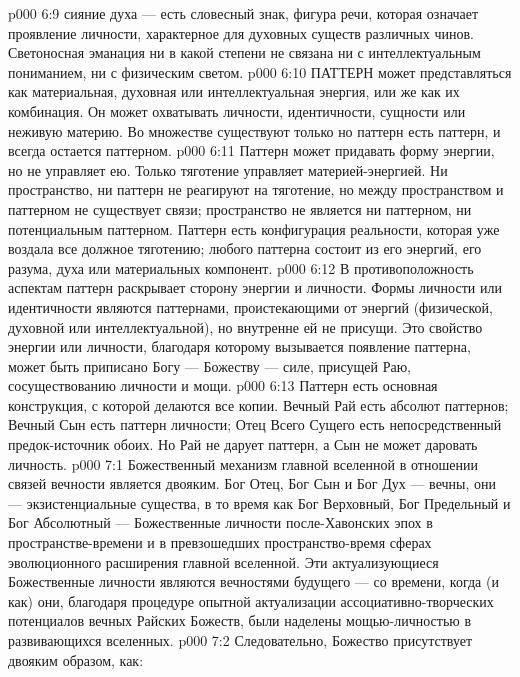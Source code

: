 \vs p000 6:9 \pc {} сияние духа --- есть словесный знак, фигура речи, которая означает проявление личности, характерное для духовных существ различных чинов. Светоносная эманация ни в какой степени не связана ни с интеллектуальным пониманием, ни с физическим светом.
\vs p000 6:10 \pc ПАТТЕРН может представляться как материальная, духовная или интеллектуальная энергия, или же как их комбинация. Он может охватывать личности, идентичности, сущности или неживую материю. Во множестве существуют только  но паттерн есть паттерн, и всегда остается паттерном.
\vs p000 6:11 Паттерн может придавать форму энергии, но не управляет ею. Только тяготение управляет материей\hyp{}энергией. Ни пространство, ни паттерн не реагируют на тяготение, но между пространством и паттерном не существует связи; пространство не является ни паттерном, ни потенциальным паттерном. Паттерн есть конфигурация реальности, которая уже воздала все должное тяготению;  любого паттерна состоит из его энергий, его разума, духа или материальных компонент.
\vs p000 6:12 В противоположность аспектам  паттерн раскрывает  сторону энергии и личности. Формы личности или идентичности являются паттернами, проистекающими от энергий (физической, духовной или интеллектуальной), но внутренне ей не присущи. Это свойство энергии или личности, благодаря которому вызывается появление паттерна, может быть приписано Богу --- Божеству --- силе, присущей Раю, сосуществованию личности и мощи.
\vs p000 6:13 Паттерн есть основная конструкция, с которой делаются все копии. Вечный Рай есть абсолют паттернов; Вечный Сын есть паттерн личности; Отец Всего Сущего есть непосредственный предок\hyp{}источник обоих. Но Рай не дарует паттерн, а Сын не может даровать личность.
\vs p000 7:1 Божественный механизм главной вселенной в отношении связей вечности является двояким. Бог Отец, Бог Сын и Бог Дух --- вечны, они --- экзистенциальные существа, в то время как Бог Верховный, Бог Предельный и Бог Абсолютный ---  Божественные личности после\hyp{}Хавонских эпох в пространстве\hyp{}времени и в превзошедших пространство\hyp{}время сферах эволюционного расширения главной вселенной. Эти актуализующиеся Божественные личности являются вечностями будущего --- со времени, когда (и как) они, благодаря процедуре опытной актуализации ассоциативно\hyp{}творческих потенциалов вечных Райских Божеств, были наделены мощью\hyp{}личностью в развивающихся вселенных.
\vs p000 7:2 Следовательно, Божество присутствует двояким образом, как:
